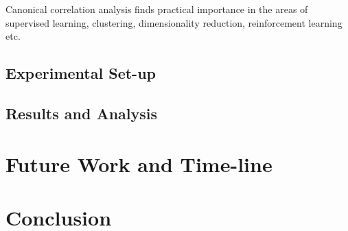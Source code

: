 \documentclass{article} %
\begin{document}
Canonical correlation analysis finds practical importance in the areas of supervised learning, clustering, dimensionality reduction, reinforcement learning etc.

\subsection{Experimental Set-up}
\subsection{Results and Analysis}




\section{Future Work and Time-line}





\section{Conclusion}



\end{document}
